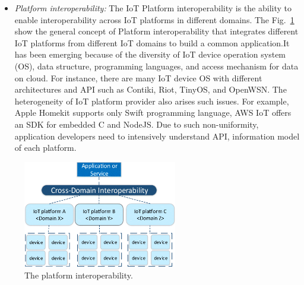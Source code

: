 \begin{itemize}
    \item \textit{Platform interoperability: } The IoT Platform interoperability is the ability to enable interoperability across IoT platforms in different domains. The Fig.~\ref{fig:c2_platform_interoperability} show the general concept of Platform interoperability that integrates different IoT platforms from different IoT domains to build a common application.It has been emerging because of the diversity of IoT device operation system (OS), data structure, programming languages, and access mechanism for data on cloud. For instance, there are many IoT device OS with different architectures and API such as Contiki, Riot, TinyOS, and OpenWSN. The heterogeneity of IoT platform provider also arises such issues. For example, Apple Homekit supports only Swift programming language, AWS IoT offers an SDK for embedded C and NodeJS. Due to such non-uniformity, application developers need to intensively understand API, information model of each platform. 
\end{itemize}

\begin{figure}[h!] 
 \begin{center} 
 \includegraphics[width=0.6\textwidth]{./Part1/Chapter2/figures/c2_platform_interoperability.png} 
    \caption{The platform interoperability.}
     \label{fig:c2_platform_interoperability}
  \end{center} 
\end{figure}

